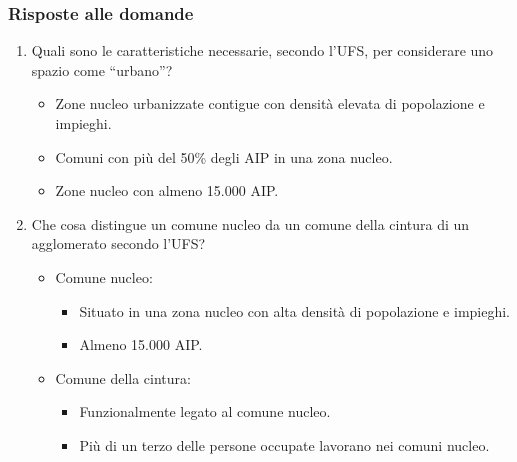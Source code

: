 \documentclass{article}
\begin{document}
\subsubsection{Risposte alle domande}
\begin{enumerate}
    \item Quali sono le caratteristiche necessarie, secondo l’UFS, per considerare uno spazio
        come “urbano”?
        \begin{itemize}
            \item Zone nucleo urbanizzate contigue con densità elevata di popolazione e
                impieghi.
            \item Comuni con più del 50\% degli AIP in una zona nucleo.
            \item Zone nucleo con almeno 15.000 AIP.
        \end{itemize}
    \item Che cosa distingue un comune nucleo da un comune della cintura di un agglomerato
        secondo l’UFS?
        \begin{itemize}
            \item Comune nucleo:
                \begin{itemize}
                    \item Situato in una zona nucleo con alta densità di popolazione e impieghi.
                    \item Almeno 15.000 AIP.
                \end{itemize}
            \item Comune della cintura:
                \begin{itemize}
                    \item Funzionalmente legato al comune nucleo.
                    \item Più di un terzo delle persone occupate lavorano nei comuni nucleo.
                \end{itemize}
        \end{itemize}
\end{enumerate}
\end{document}
